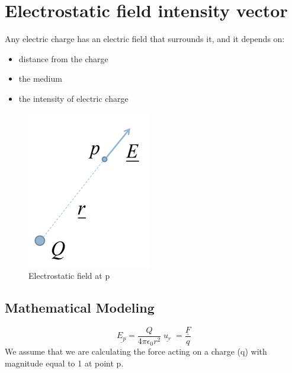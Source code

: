 \documentclass[12 pt]{article}
\begin{document}
\section{Electrostatic field intensity vector}
\begin{minipage}{0.59\linewidth}
Any electric charge has an electric field that surrounds it, and it depends on:\begin{itemize}
    \item distance from the charge
    \item the medium
    \item the intensity of electric charge
\end{itemize}
\end{minipage}
\begin{minipage}{0.4\linewidth}
    \begin{figure}[H]
    \centering
    \includegraphics[scale=0.35]{./images/electrostatic1}
    \caption{Electrostatic field at p}
    \label{electro1} 
\end{figure}
\end{minipage}
\newpage
\subsection{Mathematical Modeling}
$$\underline{E_p}=\frac{Q}{4\pi \epsilon_{0} r^2}\; \underline{u_r} \;=\frac{\underline{F}}{q}$$
We assume that we are calculating the force acting on a charge (q) with magnitude equal to 1 at point p.
\end{document}
